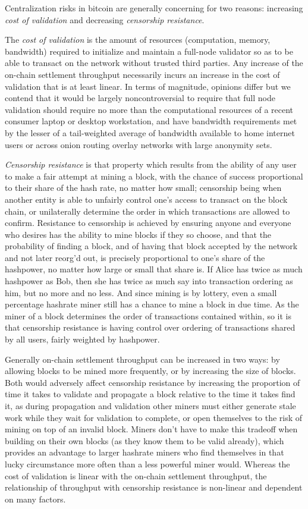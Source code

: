 Centralization risks in bitcoin are generally concerning for two
reasons: increasing \emph{cost of validation} and decreasing
\emph{censorship resistance}.

The \emph{cost of validation} is the amount of resources (computation,
memory, bandwidth) required to initialize and maintain a full-node
validator so as to be able to transact on the network without trusted
third parties.  Any increase of the on-chain settlement throughput
necessarily incurs an increase in the cost of validation that is at
least linear.  In terms of magnitude, opinions differ but we contend
that it would be largely noncontroversial to require that full node
validation should require no more than the computational resources of
a recent consumer laptop or desktop workstation, and have bandwidth
requirements met by the lesser of a tail-weighted average of bandwidth
available to home internet users or across onion routing overlay
networks with large anonymity sets.

\emph{Censorship resistance} is that property which results from the
ability of any user to make a fair attempt at mining a block, with the
chance of success proportional to their share of the hash rate, no
matter how small; censorship being when another entity is able to
unfairly control one's access to transact on the block chain, or
unilaterally determine the order in which transactions are allowed to
confirm.  Resistance to censorship is achieved by ensuring anyone and
everyone who desires has the ability to mine blocks if they so choose,
and that the probability of finding a block, and of having that block
accepted by the network and not later reorg'd out, is precisely
proportional to one's share of the hashpower, no matter how large or
small that share is.  If Alice has twice as much hashpower as Bob,
then she has twice as much say into transaction ordering as him, but
no more and no less.  And since mining is by lottery, even a small
percentage hashrate miner still has a chance to mine a block in due
time.  As the miner of a block determines the order of transactions
contained within, so it is that censorship resistance is having
control over ordering of transactions shared by all users, fairly
weighted by hashpower.

Generally on-chain settlement throughput can be increased in two ways:
by allowing blocks to be mined more frequently, or by increasing the
size of blocks.  Both would adversely affect censorship resistance by
increasing the proportion of time it takes to validate and propagate a
block relative to the time it takes find it, as during propagation and
validation other miners must either generate stale work while they
wait for validation to complete, or open themselves to the risk of
mining on top of an invalid block.  Miners don't have to make this
tradeoff when building on their own blocks (as they know them to be
valid already), which provides an advantage to larger hashrate miners
who find themselves in that lucky circumstance more often than a less
powerful miner would.  Whereas the cost of validation is linear with
the on-chain settlement throughput, the relationship of throughput
with censorship resistance is non-linear and dependent on many
factors.

